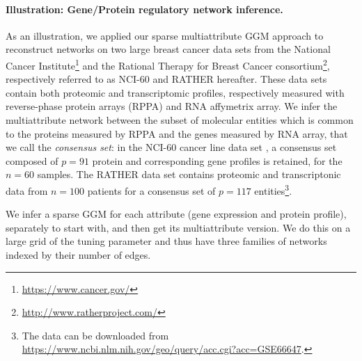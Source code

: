 \paragraph*{Illustration: Gene/Protein regulatory network inference.}

As an illustration, we applied our sparse multiattribute GGM approach
to reconstruct networks on two large breast cancer data sets from the
National Cancer Institute\footnote{\url{https://www.cancer.gov/}} and
the Rational Therapy for Breast Cancer
consortium\footnote{\url{http://www.ratherproject.com/}}, respectively
referred to as NCI-60 and RATHER hereafter. These data sets contain
both proteomic and transcriptomic profiles, respectively measured with
reverse-phase protein arrays (RPPA) and RNA affymetrix array. We infer
the multiattribute network between the subset of molecular entities
which is common to the proteins measured by RPPA and the genes
measured by RNA array, that we call the \textit{consensus set}: in the
NCI-60 cancer line data set \citep{pfister2009topoisomerase}, a
consensus set composed of $p=91$ protein and corresponding gene
profiles is retained, for the $n=60$ samples. The RATHER data set
\citep{michaut2016integration} contains proteomic and transcriptonic
data from $n=100$ patients for a consensus set of $p=117$
entities\footnote{The data can be downloaded from
  \url{https://www.ncbi.nlm.nih.gov/geo/query/acc.cgi?acc=GSE66647}.}.

We infer a sparse GGM for each attribute (gene expression and protein
profile), separately to start with, and then get its multiattribute
version.  We do this on a large grid of the tuning parameter and thus
have three families of networks indexed by their number of edges.

